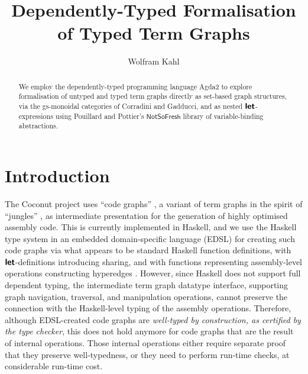 \documentclass[copyright]{eptcs}
\title{Dependently-Typed Formalisation of Typed Term Graphs}
\author{Wolfram Kahl
\institute{McMaster University,
Hamilton, Ontario, Canada,
\email{kahl@cas.mcmaster.ca}
}
}
\newcommand{\Conid}[1]{\mathit{#1}}
\newcommand{\Varid}[1]{\mathit{#1}}
\renewcommand\Varid[1]{\mathord{\textsf{#1}}}
\let\Conid\Varid
\newcommand\Keyword[1]{\textsf{\textbf{#1}}}
\newcounter{x}
\newcounter{y}
\begin{document}
\maketitle
\pagestyle{headings}

\begin{abstract}
We employ the dependently-typed programming language Agda2
to explore formalisation of untyped and typed term graphs
directly as set-based graph structures,
via the gs-monoidal categories of Corradini and Gadducci,
and as nested \ensuremath{\Keyword{let}}-expressions using Pouillard and Pottier's
\ensuremath{\Conid{NotSoFresh}} library of variable-binding abstractions.
\end{abstract}



\section{Introduction}

The Coconut project \cite{Anand-Kahl-2009b,Anand-Kahl-2009a}
uses ``code graphs'' \cite{Kahl-Anand-Carette-2005},
a variant of term graphs in the spirit of
``jungles'' \cite{Hoffmann-Plump-1991,Corradini-Rossi-1991},
as intermediate presentation for the generation of
highly optimised assembly code.
This is currently implemented in Haskell,
and we use the Haskell type system in an embedded domain-specific
language (EDSL) for creating such code graphs
via what appears to be standard Haskell function definitions,
with \ensuremath{\Keyword{let}}-definitions introducing sharing,
and with functions representing assembly-level operations
constructing hyperedges \cite{Anand-Kahl-2009b}.
However, since Haskell does not support full dependent typing,
the intermediate term graph datatype interface,
supporting graph navigation, traversal, and manipulation operations,
cannot preserve the connection with the Haskell-level typing of the assembly
operations.
Therefore, although EDSL-created code graphs are
\emph{well-typed by construction, as certified by the type checker},
this does not hold anymore for code graphs that are the result
of internal operations.
Those internal operations either require separate proof
that they preserve well-typedness,
or they need to perform run-time checks, at considerable run-time cost.
\end{document}
